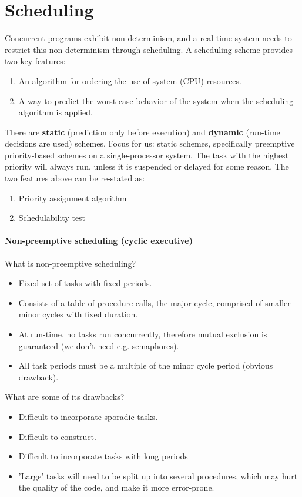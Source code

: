 \part{Scheduling}
Concurrent programs exhibit non-determinism, and a real-time system needs to restrict this non-determinism through scheduling. A scheduling scheme provides two key features:
\begin{enumerate}
    \item An algorithm for ordering the use of system (CPU) resources.
    \item A way to predict the worst-case behavior of the system when the scheduling algorithm is applied.
\end{enumerate}  
There are \textbf{static} (prediction only before execution) and \textbf{dynamic} (run-time decisions are used) schemes. Focus for us: static schemes, specifically preemptive priority-based schemes on a single-processor system. The task with the highest priority will always run, unless it is suspended or delayed for some reason. The two features above can be re-stated as:
\begin{enumerate}
    \item Priority assignment algorithm
    \item Schedulability test
\end{enumerate}

\subsection{Non-preemptive scheduling (cyclic executive)}
What is non-preemptive scheduling?
\begin{itemize}
    \item Fixed set of tasks with fixed periods.
    \item Consists of a table of procedure calls, the major cycle, comprised of smaller minor cycles with fixed duration.
    \item At run-time, no tasks run concurrently, therefore mutual exclusion is guaranteed (we don't need e.g. semaphores).
    \item All task periods must be a multiple of the minor cycle period (obvious drawback).
\end{itemize}
What are some of its drawbacks?
\begin{itemize}
    \item Difficult to incorporate sporadic tasks.
    \item Difficult to construct.
    \item Difficult to incorporate tasks with long periods
    \item 'Large' tasks will need to be split up into several procedures, which may hurt the quality of the code, and make it more error-prone.
\end{itemize}

